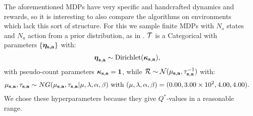 \documentclass{article}
\begin{document}
\begin{appendices}
The aforementioned MDPs have very specific and handcrafted dynamics and rewards, so it is interesting to also compare the algorithms on environments which lack this sort of structure. For this we sample finite MDPs with $N_s$ states and $N_a$ action from a prior distribution, as in \cite{psrl}. $\mathcal{T}$ is a Categorical with parameters $\{\boldsymbol{\eta_{\mathbf{s}, \mathbf{a}}}\}$ with:
\begin{align*}
\boldsymbol{\eta}_{\mathbf{s}, \mathbf{a}} \sim \text{Dirichlet}(\boldsymbol{\kappa}_{\mathbf{s}, \mathbf{a}}),
\end{align*}
with pseudo-count parameters $\boldsymbol{\kappa}_{\mathbf{s}, \mathbf{a}} = \mathbf{1}$, while $\mathcal{R} \sim \mathcal{N}(\mu_{\mathbf{s}, \mathbf{a}}, \tau_{\mathbf{s}, \mathbf{a}}^{-1})$ with:
\begin{align*}
\mu_{\mathbf{s}, \mathbf{a}}, \tau_{\mathbf{s}, \mathbf{a}} \sim NG(\mu_{\mathbf{s}, \mathbf{a}}, \tau_{\mathbf{s}, \mathbf{a}} | \mu, \lambda, \alpha, \beta) \text{ with } (\mu, \lambda, \alpha, \beta) = (0.00, 3.00 \times 10^2, 4.00, 4.00).
\end{align*}
We chose these hyperparameters because they give $Q^*$-values in a reasonable range.


\end{appendices}
\end{document}
